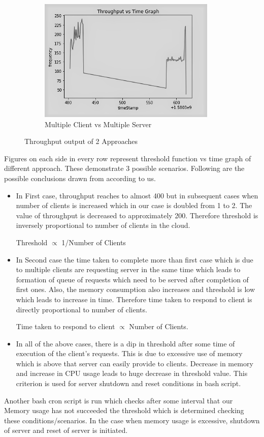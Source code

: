 \documentclass[11pt]{article}
\begin{document}
\begin{figure}[H]
\begin{subfigure}{0.40\textwidth}
      \includegraphics[width=\linewidth]{2-3}
      \caption{Multiple Client vs Multiple Server}
      \label{fig:6}
    \end{subfigure}
\caption{Throughput output of 2 Approaches}
\label{fig:images}
\end{figure}

Figures on each side in every row represent threshold function vs time graph of different approach. These demonstrate 3 possible scenarios. Following are the possible conclusions drawn from according to us.
\begin{itemize}
    \item In First case, throughput reaches to almost 400 but in subsequent cases when number of clients is increased which in our case is doubled from 1 to 2. The value of throughput is decreased to approximately 200. Therefore threshold is inversely proportional to number of clients in the cloud. \par
    \centering
        Threshold $\propto$ 1/Number of Clients
    \item In Second case the time taken to complete more than first case which is due to multiple clients are requesting server in the same time which leads to formation of queue of requests which need to be served after completion of first ones. Also, the memory consumption also increases and threshold is low which leads to increase in time. Therefore time taken to respond to client is directly proportional to number of clients. \par
    \centering
        Time taken to respond to client $\propto$ Number of Clients.
    \item In all of the above cases, there is a dip in threshold after some time of execution of the client's requests. This is due to excessive use of memory which is above that server can easily provide to clients. Decrease in memory and increase in CPU usage leads to huge decrease in threshold value. This criterion is used for server shutdown and reset conditions in bash script.
\end{itemize}
Another bash cron script is run which checks after some interval that our Memory usage has not succeeded the threshold which is determined checking these conditions/scenarios. In the case when memory usage is excessive, shutdown of server and reset of server is initiated.
\end{document}
